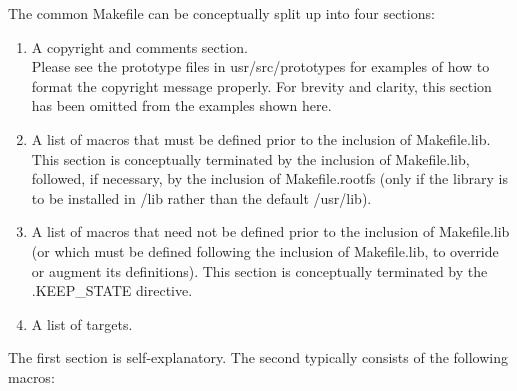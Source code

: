 \documentclass{article}
\begin{document}
The common Makefile can be conceptually split up into four sections:

\begin{enumerate}
\item A copyright and comments section. \\
  Please see the prototype files in usr/src/prototypes for examples of how to
  format the copyright message properly. For brevity and clarity, this section
  has been omitted from the examples shown here.
\item A list of macros that must be defined prior to the inclusion of
  Makefile.lib. \hfill \\
  This section is conceptually terminated by the inclusion of Makefile.lib,
  followed, if necessary, by the inclusion of Makefile.rootfs (only if the
  library is to be installed in /lib rather than the default /usr/lib).
\item A list of macros that need not be defined prior to the inclusion of
  Makefile.lib \hfill \\
  (or which must be defined following the inclusion of Makefile.lib, to override
  or augment its definitions). This section is conceptually terminated by the
  .KEEP\_STATE directive.
\item A list of targets.
\end{enumerate}

The first section is self-explanatory. The second typically consists of the
following macros:
\end{document}
